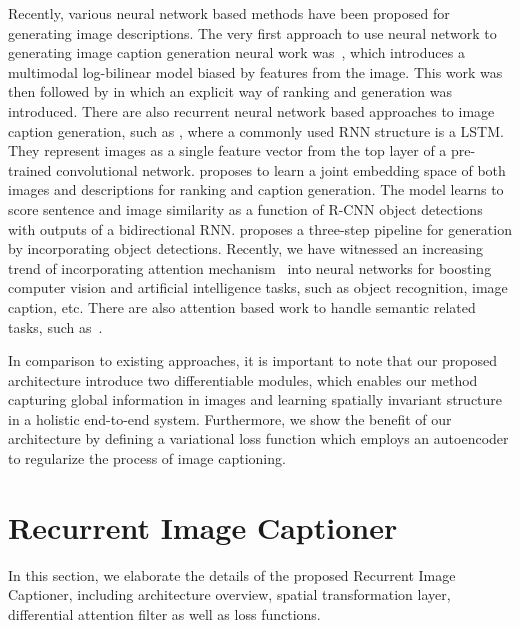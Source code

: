 \documentclass[10pt,twocolumn,letterpaper]{article}
\begin{document}
	Recently, various neural network based methods have been proposed for generating image descriptions. The very first approach to use neural network to generating image caption generation neural work was~\cite{kiros2014multimodal}, which
	introduces a multimodal log-bilinear model biased by features from the image. This work was then followed by \cite{kiros2014unifying} in which an explicit way of ranking and generation was introduced. There are also recurrent neural network based approaches to image caption generation, such as \cite{bahdanau2014neural, cho2014learning,donahue2015long,sutskever2014sequence,vinyals2015show}, where a commonly used RNN structure is a LSTM. They represent images as a single feature vector from the top layer of a pre-trained convolutional network.
	\cite{mao2014deep} proposes to learn a joint embedding space of both images and descriptions for ranking and caption generation. The model learns to score sentence and image similarity as a function of R-CNN object detections with outputs of a bidirectional RNN. \cite{fang2015captions} proposes a three-step pipeline for generation by incorporating object detections. Recently, we have witnessed an increasing trend of incorporating attention mechanism~\cite{fang2015captions,karpathy2015deep,kiros2014unifying,vinyals2015show,xu2015show} into neural networks for boosting computer vision and artificial intelligence tasks, such as object recognition, image caption, etc. There are also attention based work to handle semantic related tasks, such as~\cite{fang2015captions}.
	
	In comparison to existing approaches, it is important to note that our proposed architecture introduce two differentiable modules, which enables our method capturing global information in images and learning spatially invariant structure in a holistic end-to-end system. Furthermore, we show the benefit of our architecture by defining a variational loss function which employs an autoencoder to regularize the process of image captioning.
	
	\section{Recurrent Image Captioner}
	In this section, we elaborate the details of the proposed Recurrent Image Captioner, including architecture overview, spatial transformation layer, differential attention filter as well as loss functions.
	
\end{document}
